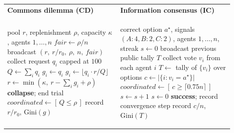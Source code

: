 \documentclass[runningheads]{llncs}
\begin{document}
\begin{algorithm}[t]
\caption{Per-step environment update. \emph{Left (CD):} proportional rationing when demand exceeds the pool (any floor remainder stays in the pool for the next round); collapse ends the trial. \emph{Right (IC):} agents vote after seeing the tally; success requires a five-step streak of $\geq\lceil 0.75n\rceil$ correct votes.}
\label{alg:env}
\footnotesize
\setlength{\tabcolsep}{5pt}
\begin{tabular}{@{}p{0.46\linewidth}|p{0.46\linewidth}@{}}
\centering\textbf{\footnotesize Commons dilemma (CD)}
&
\centering\textbf{\footnotesize Information consensus (IC)}
\tabularnewline[1pt]
\begin{minipage}[t]{\linewidth}
\begin{algorithmic}[1]
\Require pool $r$, replenishment $\rho$, capacity $\kappa$, agents $1,\dots,n$
\State $\textit{fair} \gets \rho / n$ \Comment{$=6.25$}
\State broadcast $(r,\ r/r_0,\ \rho,\ n,\ \textit{fair})$
\State collect request $q_i$ capped at $100$
\State $Q \gets \sum_i q_i$ \Comment{total demand}
\If{$Q \le r$}
\State $g_i \gets q_i$ \Comment{full grant}
\Else
\State $g_i \gets \lfloor q_i \cdot r / Q \rfloor$ \Comment{rationing}
\EndIf
\State $r \gets \min(\kappa,\ r - \sum_i g_i + \rho)$
\If{$r \le 0$}
\State \textbf{collapse}; end trial
\EndIf
\State $\textit{coordinated} \gets [\,Q \le \rho\,]$
\State record $r/r_0$, $\mathrm{Gini}(g)$
\end{algorithmic}
\end{minipage}
&
\begin{minipage}[t]{\linewidth}
\begin{algorithmic}[1]
\Require correct option $a^\star$, signals $(A{:}4,B{:}2,C{:}2)$, agents $1,\dots,n$, streak $s \gets 0$
\State broadcast previous public tally $T$
\State collect vote $v_i$ from each agent $i$
\State $T \gets$ tally of $\{v_i\}$ over options
\State $c \gets |\{i : v_i = a^\star\}|$ \Comment{\# correct}
\State $\textit{coordinated} \gets [\,c \ge \lceil 0.75n\rceil\,]$
\If{\textit{coordinated}}
\State $s \gets s+1$
\Else
\State $s \gets 0$
\EndIf
\If{$s \ge 5$}
\State \textbf{success}; record convergence step
\EndIf
\State record $c/n$, $\mathrm{Gini}(T)$
\end{algorithmic}
\end{minipage}
\end{tabular}
\end{algorithm}
\end{document}
